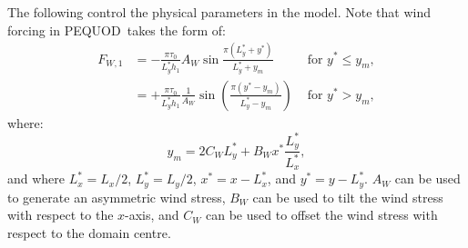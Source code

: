 \documentclass[a4paper]{book}
\newcommand{\pequod}{PEQUOD}
\begin{document}
The following control the physical parameters in the model. Note that wind
forcing in \pequod\ takes the form of:
\begin{align}\label{eqn:wind}
  F_{W,1} & = -\frac{\pi \tau_0}{L_y^* h_1} A_W \sin \frac{\pi \left( L_y^* + y^* \right)}{L_y^* + y_m}
                         & \textrm{ for } y^* \leq y_m, \\
          & = +\frac{\pi \tau_0}{L_y^* h_1} \frac{1}{A_W} \sin \left( \frac{\pi \left( y^* - y_m \right)}{L_y^* - y_m} \right)
                         & \textrm{ for } y^* > y_m,
\end{align}
where:
\begin{equation}\label{eqn:wind_shift}
  y_m = 2 C_W L_y^* + B_W x^* \frac{L_y^*}{L_x^*},
\end{equation}
and where $L_x^* = L_x / 2$, $L_y^* = L_y / 2$, $x^* = x - L_x^*$, and
$y^* = y - L_y^*$. $A_W$ can be used to generate an asymmetric wind stress,
$B_W$ can be used to tilt the wind stress with respect to the $x$-axis, and
$C_W$ can be used to offset the wind stress with respect to the domain centre.
\end{document}
